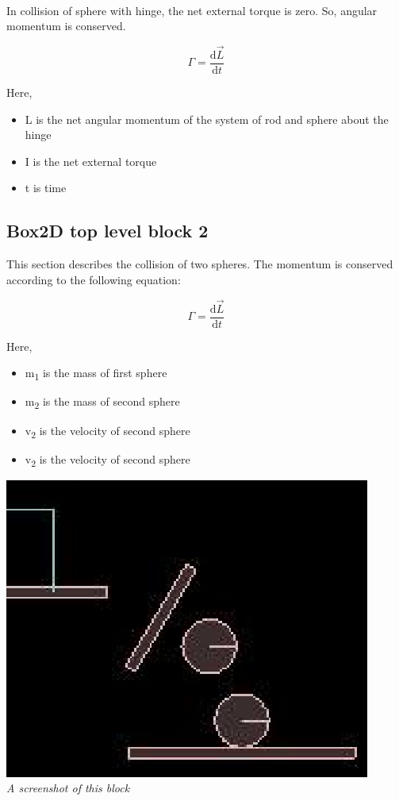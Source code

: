 \documentclass[11pt]{article}
\begin{document}
\paragraph{}
In collision of sphere with hinge, the net external torque is zero. So, angular momentum is conserved.

\begin{equation}
		\Gamma =  \frac{\mathrm{d} \vec{L}}{\mathrm{d} t}
\end{equation}

Here, 	
\begin{itemize}
\item L is the net angular momentum of the system of rod and sphere about the hinge
\item I is the net external torque
\item t is time
\end{itemize}


\subsection{Box2D top level block 2}

This section describes the collision of two spheres. The momentum is conserved according to the following equation:

\begin{equation}
		\Gamma =  \frac{\mathrm{d} \vec{L}}{\mathrm{d} t}
\end{equation}

Here, 	
\begin{itemize}
\item m\textsubscript{1} is the mass of first sphere
\item m\textsubscript{2} is the mass of second sphere
\item v\textsubscript{2} is the velocity of second sphere
\item v\textsubscript{2} is the velocity of second sphere
\end{itemize}

\begin{center}
  \includegraphics[scale = 1]{ob2} \\
  \emph{A screenshot of this block} \\
\end{center}
\end{document}
